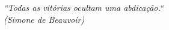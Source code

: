\begin{epigrafe}
    \vspace*{\fill}
	\begin{flushright}
		\textit{``Todas as vitórias ocultam uma abdicação.``\\
		(Simone de Beauvoir)}
	\end{flushright}
\end{epigrafe}